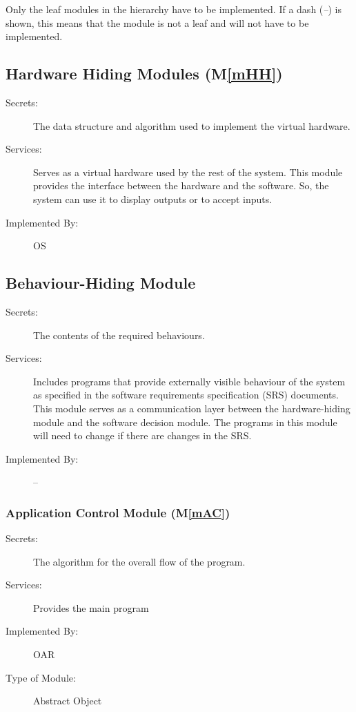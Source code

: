 \documentclass[12pt, titlepage]{article}
\newcommand{\mref}[1]{M\ref{#1}}
\begin{document}
Only the leaf modules in the hierarchy have to be implemented. If a dash
(\emph{--}) is shown, this means that the module is not a leaf and will not have
to be implemented.

\subsection{Hardware Hiding Modules (\mref{mHH})}

\begin{description}
\item[Secrets:]The data structure and algorithm used to implement the virtual
  hardware.
\item[Services:]Serves as a virtual hardware used by the rest of the
  system. This module provides the interface between the hardware and the
  software. So, the system can use it to display outputs or to accept inputs.
\item[Implemented By:] OS
\end{description}

\subsection{Behaviour-Hiding Module}

\begin{description}
\item[Secrets:]The contents of the required behaviours.
\item[Services:]Includes programs that provide externally visible behaviour of
  the system as specified in the software requirements specification (SRS)
  documents. This module serves as a communication layer between the
  hardware-hiding module and the software decision module. The programs in this
  module will need to change if there are changes in the SRS.
\item[Implemented By:] --
\end{description}

\subsubsection{Application Control Module (\mref{mAC})}

\begin{description}
\item[Secrets:] The algorithm for the overall flow of the program.
\item[Services:] Provides the main program
\item[Implemented By:] OAR
\item[Type of Module:] Abstract Object
\end{description}
\end{document}
